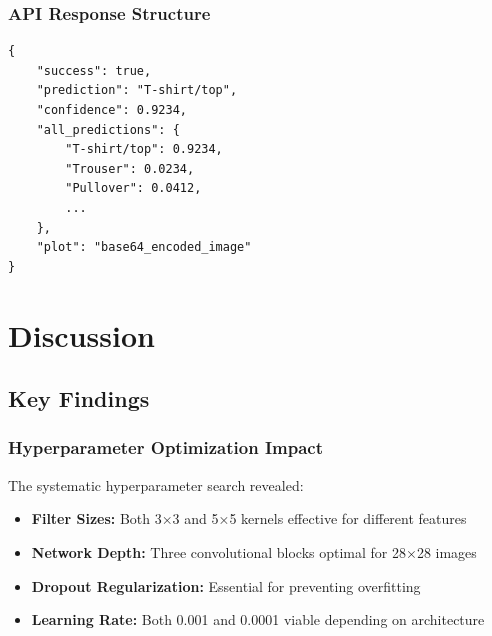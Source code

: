 \documentclass[12pt,a4paper]{article}
\begin{document}
\subsubsection{API Response Structure}
\begin{lstlisting}[caption={Prediction Response Format}]
{
    "success": true,
    "prediction": "T-shirt/top",
    "confidence": 0.9234,
    "all_predictions": {
        "T-shirt/top": 0.9234,
        "Trouser": 0.0234,
        "Pullover": 0.0412,
        ...
    },
    "plot": "base64_encoded_image"
}
\end{lstlisting}

\section{Discussion}

\subsection{Key Findings}

\subsubsection{Hyperparameter Optimization Impact}
The systematic hyperparameter search revealed:
\begin{itemize}
    \item \textbf{Filter Sizes:} Both 3×3 and 5×5 kernels effective for different features
    \item \textbf{Network Depth:} Three convolutional blocks optimal for 28×28 images
    \item \textbf{Dropout Regularization:} Essential for preventing overfitting
    \item \textbf{Learning Rate:} Both 0.001 and 0.0001 viable depending on architecture
\end{itemize}
\end{document}
